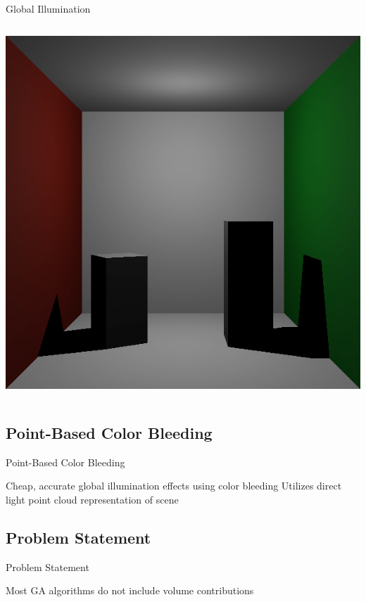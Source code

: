 \documentclass[compress,professionalfont]{beamer}
\begin{document}
\begin{frame}{Global Illumination}
\begin{columns}
\begin{column}{0.35\textwidth}
            \includegraphics[width=\textwidth]{../img/boxes_noindirect}
        \end{column}
    \end{columns}

\end{frame}




\subsection{Point-Based Color Bleeding}
\begin{frame}{Point-Based Color Bleeding}

Cheap, accurate global illumination effects using color bleeding
Utilizes direct light point cloud representation of scene

\end{frame}




\subsection{Problem Statement}
\begin{frame}{Problem Statement}

Most GA algorithms do not include volume contributions

\end{frame}
\end{document}
